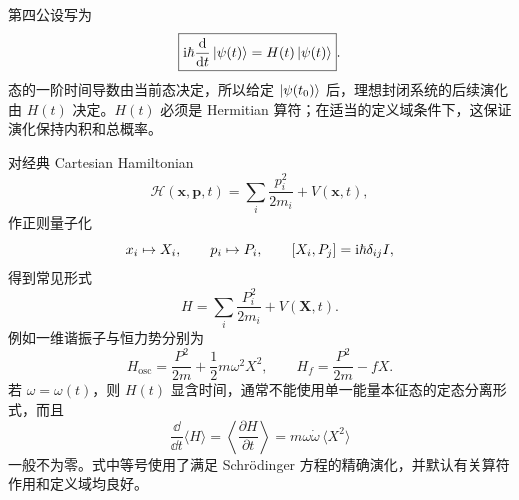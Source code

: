 

第四公设写为
\begin{equation}
  \boxed{\mathrm{i}\hbar\frac{\mathop{}\!\mathrm{d}}{\mathop{}\!\mathrm{d} t}\left|\psi(t)\right\rangle
  =H(t)\left|\psi(t)\right\rangle}.
  \label{eq:QM-C04-S03-schrodinger-abstract}
\end{equation}
态的一阶时间导数由当前态决定，所以给定 $\left|\psi(t_0)\right\rangle$ 后，理想封闭系统的后续演化由 $H(t)$ 决定。$H(t)$ 必须是 Hermitian 算符；在适当的定义域条件下，这保证演化保持内积和总概率。

对经典 Cartesian Hamiltonian
\begin{equation}
  \mathcal H(\bm x,\bm p,t)
  =\sum_i\frac{p_i^2}{2m_i}+V(\bm x,t),
  \label{eq:QM-C04-S03-classical-hamiltonian}
\end{equation}
作正则量子化
\begin{equation}
  x_i\mapsto X_i,
  \qquad
  p_i\mapsto P_i,
  \qquad
  \left[X_i,P_j\right]=\mathrm{i}\hbar\delta_{ij}I,
  \label{eq:QM-C04-S03-canonical-quantization}
\end{equation}
得到常见形式
\begin{equation}
  H=\sum_i\frac{P_i^2}{2m_i}+V(\bm X,t).
  \label{eq:QM-C04-S03-standard-hamiltonian}
\end{equation}
例如一维谐振子与恒力势分别为
\begin{equation}
  H_{\mathrm{osc}}=\frac{P^2}{2m}+\frac12m\omega^2X^2,
  \qquad
  H_f=\frac{P^2}{2m}-fX.
  \label{eq:QM-C04-S03-basic-hamiltonians}
\end{equation}
若 $\omega=\omega(t)$，则 $H(t)$ 显含时间，通常不能使用单一能量本征态的定态分离形式，而且
\begin{equation}
  \frac{\dd}{\dd t}\langle H\rangle
  =\left\langle\frac{\partial H}{\partial t}\right\rangle
  =m\omega\dot\omega\,\langle X^2\rangle
  \label{eq:QM-C04-S03-time-dependent-energy}
\end{equation}
一般不为零。式中等号使用了满足 Schrödinger 方程的精确演化，并默认有关算符作用和定义域均良好。

